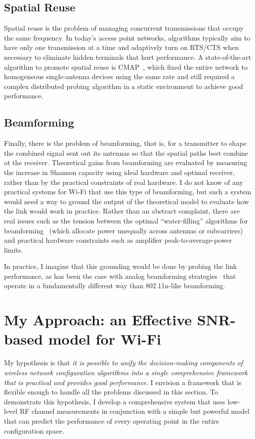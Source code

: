 \subsection{Spatial Reuse}
Spatial reuse is the problem of managing concurrent transmissions that occupy the same frequency. In today's access point networks, algorithms typically aim to have only one transmission at a time and adaptively turn on RTS/CTS when necessary to eliminate hidden terminals that hurt performance. A state-of-the-art algorithm to promote spatial reuse is CMAP~\cite{Vutukuru_CMAP}, which fixed the entire network to homogeneous single-antenna devices using the same rate and still required a complex distributed probing algorithm in a static environment to achieve good performance.

\subsection{Beamforming}
Finally, there is the problem of beamforming, that is, for a transmitter to shape the combined signal sent out its antennas so that the spatial paths best combine at the receiver. Theoretical gains from beamforming are evaluated by measuring the increase in Shannon capacity using ideal hardware and optimal receiver, rather than by the practical constraints of real hardware. I do not know of any practical systems for Wi-Fi that use this type of beamforming, but such a system would need a way to ground the output of the theoretical model to evaluate how the link would work in practice. Rather than an abstract complaint, there are real issues such as the tension between the optimal ``water-filling'' algorithms for beamforming~\cite{Tse} (which allocate power unequally across antennas or subcarriers) and practical hardware constraints such as amplifier peak-to-average-power limits.

In practice, I imagine that this grounding would be done by probing the link performance, as has been the case with analog beamforming strategies~\cite{Liu_DIRC} that operate in a fundamentally different way than 802.11n-like beamforming.

\section{My Approach: an Effective SNR-based model for Wi-Fi}
My hypothesis is that \emph{it is possible to unify the decision-making components of wireless network configuration algorithms into a single comprehensive framework that is practical and provides good performance}. I envision a framework that is flexible enough to handle all the problems discussed in this section. To demonstrate this hypothesis, I develop a comprehensive system that uses low-level RF channel measurements in conjunction with a simple but powerful model that can predict the performance of every operating point in the entire configuration space. 

